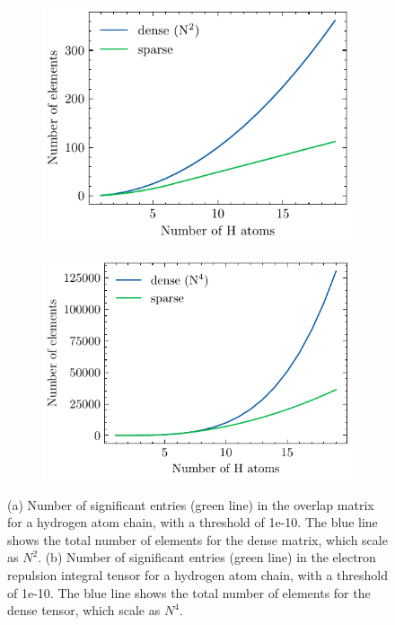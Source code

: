 \begin{figure}[h]
\centering
\begin{subfigure}{0.45\linewidth}
\includegraphics[scale=0.8]{overlap_nze}
\caption{}
\end{subfigure}
\begin{subfigure}{0.45\linewidth}
\includegraphics[scale=0.8]{eri_nze}
\caption{}
\end{subfigure}%
\caption{(a) Number of significant entries (green line) in the overlap matrix for a hydrogen atom chain, with a threshold of 1e-10. The blue line shows the total number of elements for the dense matrix, which scale as $N^2$. (b) Number of significant entries (green line) in the electron repulsion integral tensor for a hydrogen atom chain, with a threshold of 1e-10. The blue line shows the total number of elements for the dense tensor, which scale as $N^4$.}
\label{fig:HCHAIN_ERINZE}
\end{figure}

